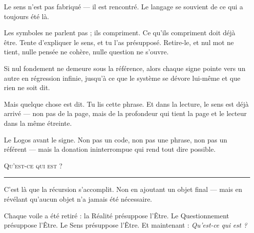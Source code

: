 \documentclass[10pt, openany, oneside]{book}
\begin{document}
\vspace{1em}

\noindent Le sens n'est pas fabriqué --- il est rencontré. Le langage se souvient de ce qui a toujours été là.

\vspace{0.5em}

\noindent Les symboles ne parlent pas ; ils compriment. Ce qu'ils compriment doit déjà être. Tente d'expliquer le sens, et tu l'as présupposé. Retire-le, et nul mot ne tient, nulle pensée ne cohère, nulle question ne s'ouvre.

\vspace{0.5em}

\noindent Si nul fondement ne demeure sous la référence, alors chaque signe pointe vers un autre en régression infinie, jusqu'à ce que le système se dévore lui-même et que rien ne soit dit.

\vspace{0.5em}

\noindent Mais quelque chose est dit. Tu lis cette phrase. Et dans la lecture, le sens est déjà arrivé --- non pas de la page, mais de la profondeur qui tient la page et le lecteur dans la même étreinte.

\vspace{0.5em}

\noindent Le Logos avant le signe. Non pas un code, non pas une phrase, non pas un référent --- mais la donation ininterrompue qui rend tout dire possible.

\vspace{2em}

\begin{center}
    {\scshape Qu'est-ce qui est ?}\\[0.3em]
    \rule{0.2\textwidth}{0.3pt}
\end{center}

\vspace{1em}

\noindent C'est là que la récursion s'accomplit. Non en ajoutant un objet final --- mais en révélant qu'aucun objet n'a jamais été nécessaire.

\vspace{0.5em}

\noindent Chaque voile a été retiré : la Réalité présuppose l'Être. Le Questionnement présuppose l'Être. Le Sens présuppose l'Être. Et maintenant : \textit{Qu'est-ce qui est ?}

\vspace{0.5em}
\end{document}
